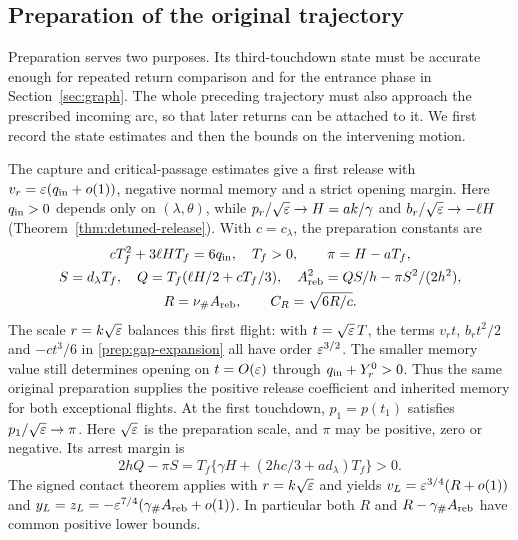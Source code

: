 \subsection{Preparation of the original trajectory}

Preparation serves two purposes. Its third-touchdown state must be
accurate enough for repeated return comparison and for the entrance
phase in Section~\ref{sec:graph}. The whole preceding trajectory
must also approach the prescribed incoming arc, so that later returns
can be attached to it. We first record the state estimates and then
the bounds on the intervening motion.

The capture and critical-passage estimates give a first release with
$v_r=\varepsilon(q_{\rm in}+o(1))$, negative normal memory and a strict
opening margin. Here $q_{\rm in}>0$ depends only on $(\lambda,\theta)$,
while $p_r/\sqrt{\varepsilon}\to H=ak/\gamma$ and
$b_r/\sqrt{\varepsilon}\to-\ell H$
(Theorem~\ref{thm:detuned-release}). With $c=c_\lambda$, the
preparation constants are
\begin{equation}
 \begin{gathered}
 cT_f^2+3\ell HT_f=6q_{\rm in},\quad T_f>0,
 \qquad \pi=H-aT_f,\\
 S=d_\lambda T_f,\quad Q=T_f(\ell H/2+cT_f/3),\quad
 A_{\rm reb}^2=QS/h-\pi S^2/(2h^2),\\
 R=\nu_\#A_{\rm reb},\qquad C_R=\sqrt{6R/c}.
 \label{loc:preparation-constants}
 \end{gathered}
\end{equation}
The scale $r=k\sqrt{\varepsilon}$ balances this first flight: with
$t=\sqrt{\varepsilon}\,T$, the terms $v_rt$, $b_rt^2/2$ and $-ct^3/6$
in \eqref{prep:gap-expansion} all have order $\varepsilon^{3/2}$.
The smaller memory value still determines opening on $t=O(\varepsilon)$
through $q_{\rm in}+Y_r^0>0$. Thus the same original preparation
supplies the positive release coefficient and inherited memory for
both exceptional flights.
At the first touchdown, $p_1=p(t_1)$ satisfies
$p_1/\sqrt{\varepsilon}\to\pi$. Here $\sqrt{\varepsilon}$ is the preparation scale,
and $\pi$ may be positive, zero or negative. Its arrest margin is
\[
 2hQ-\pi S
 =T_f\{\gamma H+(2hc/3+ad_\lambda)T_f\}>0.
\]
The signed contact theorem applies with $r=k\sqrt{\varepsilon}$ and yields
$v_L=\varepsilon^{3/4}(R+o(1))$ and
$y_L=z_L=-\varepsilon^{7/4}(\gamma_\#A_{\rm reb}+o(1))$.
In particular both $R$ and $R-\gamma_\#A_{\rm reb}$ have common
positive lower bounds.

